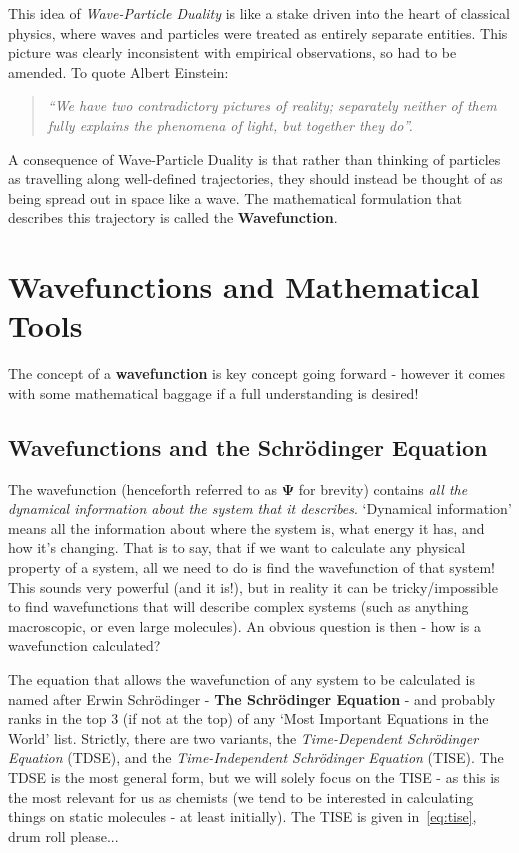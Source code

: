 \documentclass{memoir}[11pt,oneside,a4paper,openany]
\newcommand{\wf}{\ensuremath{\bm{\Psi}}\xspace}
\begin{document}
This idea of \emph{Wave-Particle Duality} is like a stake driven into the heart of classical physics, where waves and particles were treated as entirely separate entities. This picture was clearly inconsistent with empirical observations, so had to be amended. To quote Albert Einstein:
\begin{quote}
	\textit{``We have two contradictory pictures of reality; separately neither of them fully explains the phenomena of light, but together they do''.}
\end{quote}
A consequence of Wave-Particle Duality is that rather than thinking of particles as travelling along well-defined trajectories, they should instead be thought of as being spread out in space like a wave. The mathematical formulation that describes this trajectory is called the \textbf{Wavefunction}.

\section{Wavefunctions and Mathematical Tools}
The concept of a \textbf{wavefunction} is key concept going forward - however it comes with some mathematical baggage if a full understanding is desired! 

\subsection{Wavefunctions and the Schr{\"o}dinger Equation}
The wavefunction (henceforth referred to as \wf for brevity) contains \emph{all the dynamical information about the system that it describes}. `Dynamical information' means all the information about where the system is, what energy it has, and how it's changing. That is to say, that if we want to calculate any physical property of a system, all we need to do is find the wavefunction of that system! This sounds very powerful (and it is!), but in reality it can be tricky/impossible to find wavefunctions that will describe complex systems (such as anything macroscopic, or even large molecules). An obvious question is then - how is a wavefunction calculated?

The equation that allows the wavefunction of any system to be calculated is named after Erwin Schr{\"o}dinger - \textbf{The Schr{\"o}dinger Equation} - and probably ranks in the top 3 (if not at the top) of any `Most Important Equations in the World' list. Strictly, there are two variants, the \emph{Time-Dependent Schr{\"o}dinger Equation} (TDSE), and the \emph{Time-Independent Schr{\"o}dinger Equation} (TISE). The TDSE is the most general form, but we will solely focus on the TISE - as this is the most relevant for us as chemists (we tend to be interested in calculating things on static molecules - at least initially). The TISE is given in~\autoref{eq:tise}, drum roll please...
\end{document}

